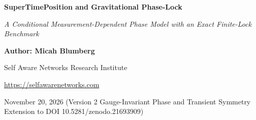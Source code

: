 \documentclass[
  american,
  11pt,
  letterpaper,
]{article}
\author{}
\date{}
\begin{document}
\begin{center}

{\LARGE\bfseries SuperTimePosition and Gravitational Phase-Lock\par}

\vspace{0.35em}

{\large\itshape A Conditional Measurement-Dependent Phase Model with an Exact Finite-Lock Benchmark\par}

\vspace{0.8em}

{\small\textbf{Author: Micah Blumberg}\par}

{\small Self Aware Networks Research Institute\par}

{\small\url{https://selfawarenetworks.com}\par}

{\small November 20, 2026 (Version 2 Gauge-Invariant Phase and Transient Symmetry Extension to DOI 10.5281/zenodo.21693909)\par}

\end{center}

\vspace{0.65em}
\end{document}
